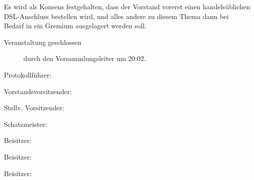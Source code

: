 \documentclass[a4paper,12pt]{scrartcl}
\begin{document}
Es wird als Konsens festgehalten, dass der Vorstand vorerst einen
handelsüblichen DSL-Anschluss bestellen wird, und alles andere zu diesem Thema
dann bei Bedarf in ein Gremium ausgelagert werden soll.

\begin{description}
\item[Veranstaltung geschlossen] durch den Versammlungsleiter um 20:02.
\end{description}

\setlength{\textwidth}{0.5\textwidth}
\vspace{0.7cm}
\noindent Protokollführer: \hrulefill

\vspace{0.7cm}
\noindent Vorstandsvorsitzender: \hrulefill

\vspace{0.7cm}
\noindent Stellv. Vorsitzender: \hrulefill

\vspace{0.7cm}
\noindent Schatzmeister: \hrulefill

\vspace{0.7cm}
\noindent Beisitzer: \hrulefill

\vspace{0.7cm}
\noindent Beisitzer: \hrulefill

\vspace{0.7cm}
\noindent Beisitzer: \hrulefill
\end{document}
